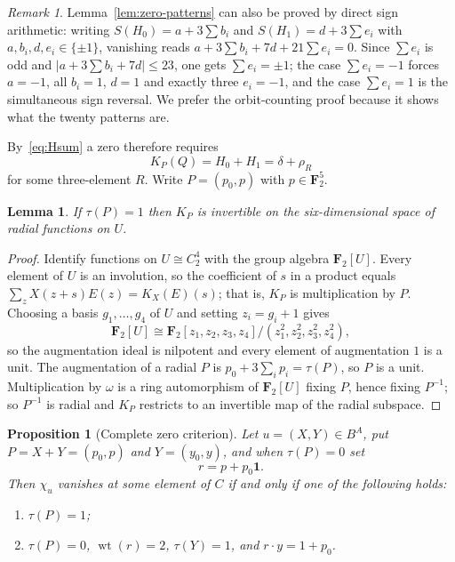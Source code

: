 \documentclass[11pt]{article}
\newtheorem{proposition}[theorem]{Proposition}
\newtheorem{lemma}[theorem]{Lemma}
\theoremstyle{definition}
\theoremstyle{remark}
\newtheorem{remark}[theorem]{Remark}
\newcommand{\F}{\mathbf F}
\newcommand{\wt}{\operatorname{wt}}
\newcommand{\one}{\mathbf 1}
\begin{document}
\begin{remark}
Lemma~\ref{lem:zero-patterns} can also be proved by direct sign
arithmetic: writing $S(H_0)=a+3\sum b_i$ and $S(H_1)=d+3\sum e_i$ with
$a,b_i,d,e_i\in\{\pm1\}$, vanishing reads
$a+3\sum b_i+7d+21\sum e_i=0$.  Since $\sum e_i$ is odd and
$|a+3\sum b_i+7d|\le23$, one gets $\sum e_i=\pm1$; the case
$\sum e_i=-1$ forces $a=-1$, all $b_i=1$, $d=1$ and exactly three
$e_i=-1$, and the case $\sum e_i=1$ is the simultaneous sign reversal.
We prefer the orbit-counting proof because it shows what the twenty
patterns are.
\end{remark}

By~\eqref{eq:Hsum} a zero therefore requires
\begin{equation}\label{eq:target}
 K_P(Q)=H_0+H_1=\delta+\rho_R
\end{equation}
for some three-element $R$.  Write $P=(p_0,p)$ with $p\in\F_2^5$.

\begin{lemma}\label{lem:odd-augmentation}
If $\tau(P)=1$ then $K_P$ is invertible on the six-dimensional space of
radial functions on $U$.
\end{lemma}

\begin{proof}
Identify functions on $U\cong C_2^4$ with the group algebra $\F_2[U]$.
Every element of $U$ is an involution, so the coefficient of $s$ in a
product equals $\sum_{z}X(z+s)E(z)=K_X(E)(s)$; that is, $K_P$ is
multiplication by $P$.  Choosing a basis $g_1,\dots,g_4$ of $U$ and
setting $z_i=g_i+1$ gives
\[
 \F_2[U]\cong\F_2[z_1,z_2,z_3,z_4]/(z_1^2,z_2^2,z_3^2,z_4^2),
\]
so the augmentation ideal is nilpotent and every element of
augmentation $1$ is a unit.  The augmentation of a radial $P$ is
$p_0+3\sum_ip_i=\tau(P)$, so $P$ is a unit.  Multiplication by
$\omega$ is a ring automorphism of $\F_2[U]$ fixing $P$, hence fixing
$P^{-1}$; so $P^{-1}$ is radial and $K_P$ restricts to an invertible
map of the radial subspace.
\end{proof}

\begin{proposition}[Complete zero criterion]\label{prop:zero-criterion}
Let $u=(X,Y)\in B^A$, put $P=X+Y=(p_0,p)$ and $Y=(y_0,y)$, and when
$\tau(P)=0$ set
\[
 r=p+p_0\one .
\]
Then $\chi_u$ vanishes at some element of $C$ if and only if one of the
following holds:
\begin{enumerate}[label=\textup{(\roman*)}]
\item $\tau(P)=1$;
\item $\tau(P)=0$, $\wt(r)=2$, $\tau(Y)=1$, and $r\cdot y=1+p_0$.
\end{enumerate}
\end{proposition}
\end{document}
